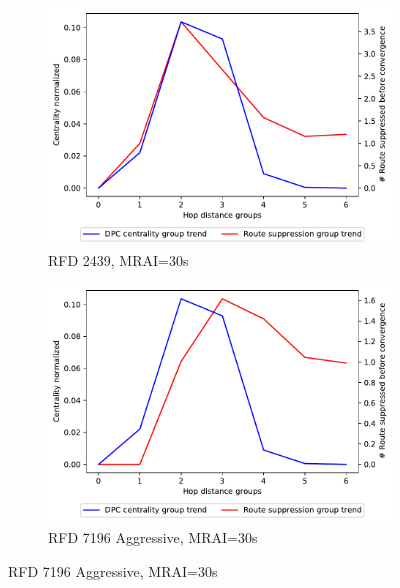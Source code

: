 \begin{figure}[H]
\begin{subfigure}[b]{0.325\textwidth}
     \end{subfigure}
     \vfill
     \begin{subfigure}[b]{0.325\textwidth}
         \centering
         \includegraphics[width=\textwidth]{images/RFD/miceVSelephants/MultiMRAI/30/mice/cisco_1000_RFD_nodeConvergence_centVSsup_trend.pdf}
         \caption{\scriptsize RFD 2439, MRAI=30s}
         \label{fig:1000_2439RFD_centVSsup_mices_MRAI30}
     \end{subfigure}
     \hfill
     \begin{subfigure}[b]{0.325\textwidth}
         \centering
         \includegraphics[width=\textwidth]{images/RFD/miceVSelephants/MultiMRAI/30/mice/cisco_1000_RFD_7196_aggressive_nodeConvergence_centVSsup_trend.pdf}
         \caption{\scriptsize RFD 7196 Aggressive, MRAI=30s}
         \label{fig:1000_7196RFDA_centVSsup_mices_MRAI30}

\end{subfigure}
\end{figure}
